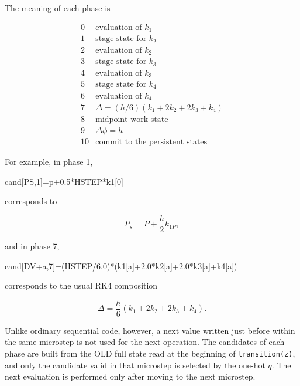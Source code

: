 \documentclass[
  a4paper,
]{article}
\newenvironment{Shaded}{}{}
\newcommand{\DecValTok}[1]{\textcolor[rgb]{0.25,0.63,0.44}{#1}}
\newcommand{\FloatTok}[1]{\textcolor[rgb]{0.25,0.63,0.44}{#1}}
\newcommand{\NormalTok}[1]{#1}
\newcommand{\OperatorTok}[1]{\textcolor[rgb]{0.40,0.40,0.40}{#1}}
\begin{document}
The meaning of each phase is

\[
\begin{array}{c|l}
0 & \text{evaluation of }k_1\\
1 & \text{stage state for }k_2\\
2 & \text{evaluation of }k_2\\
3 & \text{stage state for }k_3\\
4 & \text{evaluation of }k_3\\
5 & \text{stage state for }k_4\\
6 & \text{evaluation of }k_4\\
7 & \Delta=(h/6)(k_1+2k_2+2k_3+k_4)\\
8 & \text{midpoint work state}\\
9 & \Delta\phi=h\\
10 & \text{commit to the persistent states}
\end{array}
\]

For example, in phase 1,

\begin{Shaded}
\begin{Highlighting}[]
\NormalTok{cand[PS,}\DecValTok{1}\NormalTok{]}\OperatorTok{=}\NormalTok{p}\OperatorTok{+}\FloatTok{0.5}\OperatorTok{*}\NormalTok{HSTEP}\OperatorTok{*}\NormalTok{k1[}\DecValTok{0}\NormalTok{]}
\end{Highlighting}
\end{Shaded}

corresponds to

\[
P_s=P+\frac{h}{2}k_{1P},
\]

and in phase 7,

\begin{Shaded}
\begin{Highlighting}[]
\NormalTok{cand[DV}\OperatorTok{+}\NormalTok{a,}\DecValTok{7}\NormalTok{]}\OperatorTok{=}\NormalTok{(HSTEP}\OperatorTok{/}\FloatTok{6.0}\NormalTok{)}\OperatorTok{*}\NormalTok{(k1[a]}\OperatorTok{+}\FloatTok{2.0}\OperatorTok{*}\NormalTok{k2[a]}\OperatorTok{+}\FloatTok{2.0}\OperatorTok{*}\NormalTok{k3[a]}\OperatorTok{+}\NormalTok{k4[a])}
\end{Highlighting}
\end{Shaded}

corresponds to the usual RK4 composition

\[
\Delta
=
\frac{h}{6}
\left(k_1+2k_2+2k_3+k_4\right).
\]

Unlike ordinary sequential code, however, a next value written just
before within the same microstep is not used for the next operation. The
candidates of each phase are built from the OLD full state read at the
beginning of \texttt{transition(z)}, and only the candidate valid in
that microstep is selected by the one-hot \(q\). The next evaluation is
performed only after moving to the next microstep.
\end{document}
